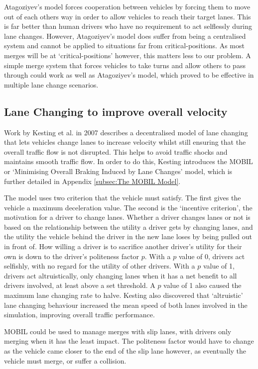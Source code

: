 Atagoziyev's model forces cooperation between vehicles by forcing them to move out of each others way in order to allow vehicles to reach their target lanes. This is far better than human drivers who have no requirement to act selflessly during lane changes. However, Atagoziyev's model does suffer from being a centralised system and cannot be applied to situations far from critical-positions. As most merges will be at `critical-positions' however, this matters less to our problem. A simple merge system that forces vehicles to take turns and allow others to pass through could work as well as Atagoziyev's model, which proved to be effective in multiple lane change scenarios.

\subsection{Lane Changing to improve overall velocity}
\label{subsec:Lane Changing to improve overall velocity}
Work by Kesting et al. in 2007 \citep{Kesting2007} describes a decentralised model of lane changing that lets vehicles change lanes to increase velocity whilst still ensuring that the overall traffic flow is not disrupted. This helps to avoid traffic shocks and maintains smooth traffic flow. In order to do this, Kesting introduces the MOBIL or `Minimising Overall Braking Induced by Lane Changes' model, which is further detailed in Appendix \ref{subsec:The MOBIL Model}. 

The model uses two criterion that the vehicle must satisfy. The first gives the vehicle a maximum deceleration value. The second is the `incentive criterion', the motivation for a driver to change lanes. Whether a driver changes lanes or not is based on the relationship between the utility a driver gets by changing lanes, and the utility the vehicle behind the driver in the new lane loses by being pulled out in front of. How willing a driver is to sacrifice another driver's utility for their own is down to the driver's politeness factor $p$. With a $p$ value of 0, drivers act selfishly, with no regard for the utility of other drivers. With a $p$ value of 1, drivers act altruistically, only changing lanes when it has a net benefit to all drivers involved, at least above a set threshold. A $p$ value of 1 also caused the maximum lane changing rate to halve. Kesting also discovered that `altruistic' lane changing behaviour increased the mean speed of both lanes involved in the simulation, improving overall traffic performance.

MOBIL could be used to manage merges with slip lanes, with drivers only merging when it has the least impact. The politeness factor would have to change as the vehicle came closer to the end of the slip lane however, as eventually the vehicle must merge, or suffer a collision. 